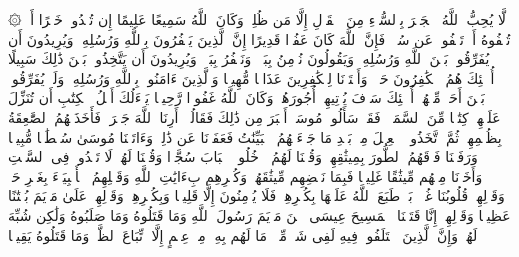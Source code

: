 \startbuffer[\q:4:148]
۞ لَّا یُحِبُّ ٱللَّهُ ٱلۡجَهۡرَ بِٱلسُّوۤءِ مِنَ ٱلۡقَوۡلِ إِلَّا مَن ظُلِمَۚ وَكَانَ ٱللَّهُ سَمِیعًا عَلِیمًا%
\stopbuffer%
\startbuffer[\q:4:149]
إِن تُبۡدُوا۟ خَیۡرًا أَوۡ تُخۡفُوهُ أَوۡ تَعۡفُوا۟ عَن سُوۤءࣲ فَإِنَّ ٱللَّهَ كَانَ عَفُوࣰّا قَدِیرًا%
\stopbuffer%
\startbuffer[\q:4:150]
إِنَّ ٱلَّذِینَ یَكۡفُرُونَ بِٱللَّهِ وَرُسُلِهِۦ وَیُرِیدُونَ أَن یُفَرِّقُوا۟ بَیۡنَ ٱللَّهِ وَرُسُلِهِۦ وَیَقُولُونَ نُؤۡمِنُ بِبَعۡضࣲ وَنَكۡفُرُ بِبَعۡضࣲ وَیُرِیدُونَ أَن یَتَّخِذُوا۟ بَیۡنَ ذَٰلِكَ سَبِیلًا%
\stopbuffer%
\startbuffer[\q:4:151]
أُو۟لَٰۤئِكَ هُمُ ٱلۡكَٰفِرُونَ حَقࣰّاۚ وَأَعۡتَدۡنَا لِلۡكَٰفِرِینَ عَذَابࣰا مُّهِینࣰا%
\stopbuffer%
\startbuffer[\q:4:152]
وَٱلَّذِینَ ءَامَنُوا۟ بِٱللَّهِ وَرُسُلِهِۦ وَلَمۡ یُفَرِّقُوا۟ بَیۡنَ أَحَدࣲ مِّنۡهُمۡ أُو۟لَٰۤئِكَ سَوۡفَ یُؤۡتِیهِمۡ أُجُورَهُمۡۚ وَكَانَ ٱللَّهُ غَفُورࣰا رَّحِیمࣰا%
\stopbuffer%
\startbuffer[\q:4:153]
یَسۡءَلُكَ أَهۡلُ ٱلۡكِتَٰبِ أَن تُنَزِّلَ عَلَیۡهِمۡ كِتَٰبࣰا مِّنَ ٱلسَّمَاۤءِۚ فَقَدۡ سَأَلُوا۟ مُوسَىٰۤ أَكۡبَرَ مِن ذَٰلِكَ فَقَالُوۤا۟ أَرِنَا ٱللَّهَ جَهۡرَةࣰ فَأَخَذَتۡهُمُ ٱلصَّٰعِقَةُ بِظُلۡمِهِمۡۚ ثُمَّ ٱتَّخَذُوا۟ ٱلۡعِجۡلَ مِنۢ بَعۡدِ مَا جَاۤءَتۡهُمُ ٱلۡبَیِّنَٰتُ فَعَفَوۡنَا عَن ذَٰلِكَۚ وَءَاتَیۡنَا مُوسَىٰ سُلۡطَٰنࣰا مُّبِینࣰا%
\stopbuffer%
\startbuffer[\q:4:154]
وَرَفَعۡنَا فَوۡقَهُمُ ٱلطُّورَ بِمِیثَٰقِهِمۡ وَقُلۡنَا لَهُمُ ٱدۡخُلُوا۟ ٱلۡبَابَ سُجَّدࣰا وَقُلۡنَا لَهُمۡ لَا تَعۡدُوا۟ فِی ٱلسَّبۡتِ وَأَخَذۡنَا مِنۡهُم مِّیثَٰقًا غَلِیظࣰا%
\stopbuffer%
\startbuffer[\q:4:155]
فَبِمَا نَقۡضِهِم مِّیثَٰقَهُمۡ وَكُفۡرِهِم بِءَایَٰتِ ٱللَّهِ وَقَتۡلِهِمُ ٱلۡأَنۢبِیَاۤءَ بِغَیۡرِ حَقࣲّ وَقَوۡلِهِمۡ قُلُوبُنَا غُلۡفُۢۚ بَلۡ طَبَعَ ٱللَّهُ عَلَیۡهَا بِكُفۡرِهِمۡ فَلَا یُؤۡمِنُونَ إِلَّا قَلِیلࣰا%
\stopbuffer%
\startbuffer[\q:4:156]
وَبِكُفۡرِهِمۡ وَقَوۡلِهِمۡ عَلَىٰ مَرۡیَمَ بُهۡتَٰنًا عَظِیمࣰا%
\stopbuffer%
\startbuffer[\q:4:157]
وَقَوۡلِهِمۡ إِنَّا قَتَلۡنَا ٱلۡمَسِیحَ عِیسَى ٱبۡنَ مَرۡیَمَ رَسُولَ ٱللَّهِ وَمَا قَتَلُوهُ وَمَا صَلَبُوهُ وَلَٰكِن شُبِّهَ لَهُمۡۚ وَإِنَّ ٱلَّذِینَ ٱخۡتَلَفُوا۟ فِیهِ لَفِی شَكࣲّ مِّنۡهُۚ مَا لَهُم بِهِۦ مِنۡ عِلۡمٍ إِلَّا ٱتِّبَاعَ ٱلظَّنِّۚ وَمَا قَتَلُوهُ یَقِینَۢا%
\stopbuffer%
